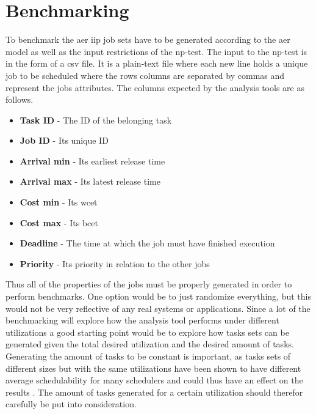 \documentclass{kththesis}
\begin{document}
\section{Benchmarking}\label{sec:benchmarking}

To benchmark the \acrshort{aer} \acrshort{iip} job sets have to be generated according to the
\acrshort{aer} model as well as the input restrictions of the \acrshort{np}-test. The input to the
\acrshort{np}-test is in the form of a \acrfull{csv} file. It is a plain-text file where each new
line holds a unique job to be scheduled where the rows columns are separated by commas and represent
the jobs attributes. The columns expected by the analysis tools are as follows.

\begin{itemize}
    \item \textbf{Task ID} - The ID of the belonging task
    \item \textbf{Job ID} - Its unique ID
    \item \textbf{Arrival min} - Its earliest release time
    \item \textbf{Arrival max} - Its latest release time
    \item \textbf{Cost min} - Its \acrshort{wcet}
    \item \textbf{Cost max} - Its \acrshort{bcet}
    \item \textbf{Deadline} - The time at which the job must have finished execution
    \item \textbf{Priority} - Its priority in relation to the other jobs
\end{itemize}



Thus all of the properties of the jobs must be properly generated in order to perform benchmarks.
One option would be to just randomize everything, but this would not be very reflective of any real
systems or applications. Since a lot of the benchmarking will explore how the analysis tool performs
under different utilizations a good starting point would be to explore how tasks sets can be
generated given the total desired utilization and the desired amount of tasks. Generating the
amount of tasks to be constant is important, as tasks sets of different sizes but with the same
utilizations have been shown to have different average schedulability for many schedulers and could
thus have an effect on the results \parencite{sebestyen_simulation-based_2012}. The amount of tasks
generated for a certain utilization should therefor carefully be put into consideration.
\end{document}

